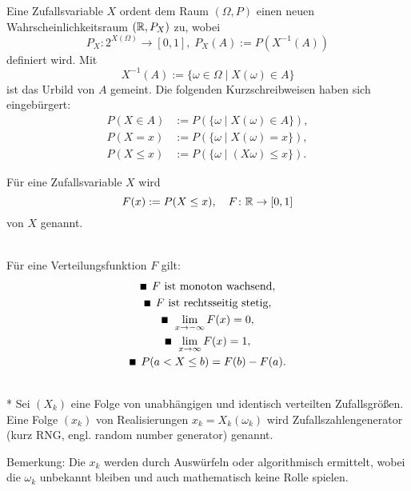 \noindent
Eine Zufallsvariable $X$ ordent dem Raum $(\Omega,P)$
einen neuen Wahrscheinlichkeitsraum $(\mathbb R,P_X)$ zu, wobei
\begin{equation}
P_X\colon 2^{X(\Omega)}\to [0,1],\; P_X(A):=P(X^{-1}(A))
\end{equation}
definiert wird. Mit
\begin{equation}
X^{-1}(A) := \{\omega\in\Omega\mid X(\omega)\in A\}
\end{equation}
ist das Urbild von $A$ gemeint.
Die folgenden Kurzschreibweisen haben sich
eingebürgert:
\begin{align}
P(X\in A) &:= P(\{\omega\mid X(\omega)\in A\}),\\
P(X=x) &:= P(\{\omega\mid X(\omega)=x\}),\\
P(X\le x) &:= P(\{\omega\mid (X\omega)\le x\}).
\end{align}

\begin{definition}[Verteilungsfunktion]\mbox{}\newline
Für eine Zufallsvariable $X$ wird
\begin{equation}
F(x):=P(X\le x),\quad F\colon\mathbb R\to [0,1]
\end{equation}
 von $X$ genannt.
\end{definition}

\noindent
{}\\
Für eine Verteilungsfunktion $F$ gilt:
\begin{gather}
\text{\scriptsize $\blacksquare$}\;\, F\text{ ist monoton wachsend},\\
\text{\scriptsize $\blacksquare$}\;\, F\text{ ist rechtsseitig stetig},\\
\text{\scriptsize $\blacksquare$}\;\, \lim\limits_{x\to -\infty} F(x) = 0,\\
\text{\scriptsize $\blacksquare$}\;\, \lim\limits_{x\to\infty} F(x)=1,\\
\text{\scriptsize $\blacksquare$}\;\, P(a<X\le b) = F(b)-F(a).
\end{gather}

\newpage
\begin{definition}[Zufallszahlengenerator]\mbox{}\\*
Sei $(X_k)$ eine Folge von unabhängigen und
identisch verteilten Zufallsgrößen. Eine Folge
$(x_k)$ von Realisierungen $x_k=X_k(\omega_k)$ wird
Zufallszahlengenerator (kurz RNG, engl. random number generator)
genannt.
\end{definition}

\noindent
Bemerkung: Die $x_k$ werden durch Auswürfeln oder algorithmisch
ermittelt, wobei die $\omega_k$ unbekannt bleiben und auch
mathematisch keine Rolle spielen.

